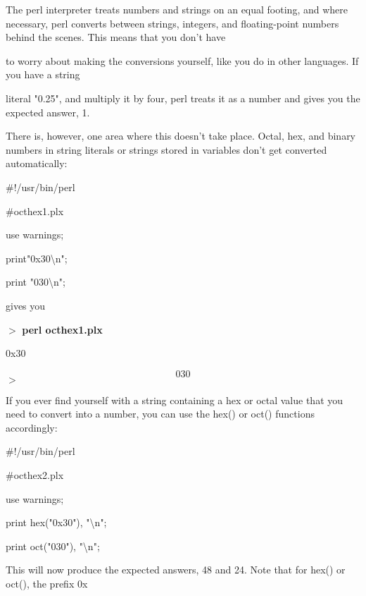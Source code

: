 \documentclass[a4paper,11pt]{book}
\begin{document}
\noindent 

\noindent The perl interpreter treats numbers and strings on an equal footing, and where necessary, perl converts between strings, integers, and floating-point numbers behind the scenes. This means that you don't have

\noindent to worry about making the conversions yourself, like you do in other languages. If you have a string

\noindent literal "0.25", and multiply it by four, perl treats it as a number and gives you the expected answer, 1.

\noindent 

\noindent There is, however, one area where this doesn't take place. Octal, hex, and binary numbers in string literals or strings stored in variables don't get converted automatically:

\noindent 

\noindent 

\noindent \#!/usr/bin/perl

\noindent \#octhex1.plx

\noindent use warnings;

\noindent print"0x30\textbackslash n";

\noindent print "030\textbackslash n";

\noindent 

\noindent gives you

\noindent 

\noindent $>$ \textbf{perl octhex1.plx}

\noindent 0x30

\[030\] 
$>$

\noindent 

\noindent If you ever find yourself with a string containing a hex or octal value that you need to convert into a number, you can use the hex() or oct() functions accordingly:

\noindent 

\noindent \#!/usr/bin/perl

\noindent \#octhex2.plx

\noindent use warnings;

\noindent print hex("0x30"), "\textbackslash n";

\noindent print oct("030"), "\textbackslash n";

\noindent 

\noindent This will now produce the expected answers, 48 and 24. Note that for hex() or oct(), the prefix 0x
\end{document}
